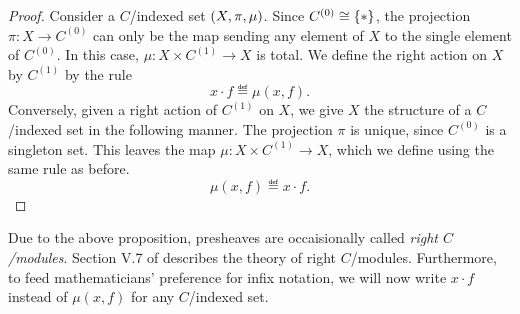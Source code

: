 \documentclass[../main.tex]{subfiles}
\begin{document}
\begin{proof}
  Consider a \(C\)\-/indexed set \({\left(X,\pi,\mu\right)}\). Since \(C^{(0)} \cong
  {\left\{\ast\right\}}\), the projection \(\pi : X \to C^{(0)}\) can only be the map
  sending any element of \(X\) to the single element of \(C^{(0)}\). In this
  case, \(\mu : X \times C^{(1)} \to X\) is total. We define the right action on
  \(X\) by \(C^{(1)}\) by the rule
  \[%
    x \cdot f \eqdef \mu(x,f).
  \]%
  Conversely, given a right action of \(C^{(1)}\) on \(X\), we give \(X\) the
  structure of a \(C\)\-/indexed set in the following manner. The projection
  \(\pi\) is unique, since \(C^{(0)}\) is a singleton set. This leaves the map
  \(\mu : X \times C^{(1)} \to X\), which we define using the same rule as
  before.
  \[%
    \mu(x,f) \eqdef x \cdot f.
  \]%
\end{proof}
Due to the above proposition, presheaves are occaisionally called \emph{right
  \(C\)\-/modules}. Section V.7 of \cite{MacLane1994} describes the theory
of right \(C\)\-/modules. Furthermore, to feed mathematicians' preference for
infix notation, we will now write \(x \cdot f\) instead of \(\mu(x,f)\) for any
\(C\)\-/indexed set.
\end{document}
